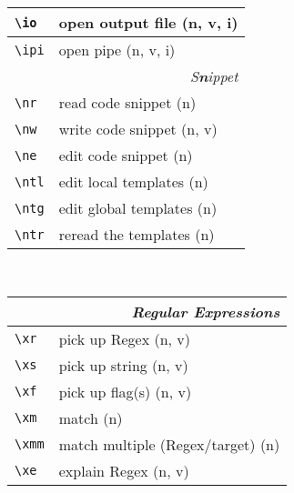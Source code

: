 \documentclass[oneside,10pt,landscape,DIV17]{scrartcl}
\begin{document}
\begin{multicols}{3}
\begin{center}
\begin{tabular}[]{|p{18mm}|p{49mm}|}
\hline \verb'\io'  & open output file          \hfill (n, v, i)\\
\hline \verb'\ipi' & open pipe                 \hfill (n, v, i)\\
\hline
\hline
\multicolumn{2}{|r|}{\textsl{S\textbf{n}ippet}}             \\[1.0ex]
\hline \verb'\nr'  & read code snippet         \hfill (n)   \\
\hline \verb'\nw'  & write code snippet        \hfill (n, v)\\
\hline \verb'\ne'  & edit code snippet         \hfill (n)   \\
%
\hline \verb'\ntl' & edit local templates      \hfill (n)   \\
\hline \verb'\ntg' & edit global templates     \hfill (n)   \\
\hline \verb'\ntr' & reread the templates      \hfill (n)   \\
\hline
\end{tabular}\\
%
%
\begin{tabular}[]{|p{11mm}|p{58mm}|}
\hline
\multicolumn{2}{|r|}{\textsl{Regular E\textbf{x}pressions}}     \\[1.0ex]
\hline \verb'\xr' &  pick up Regex                 \hfill (n, v)\\
\hline \verb'\xs' &  pick up string                \hfill (n, v)\\
\hline \verb'\xf' &  pick up flag(s)               \hfill (n, v)\\
\hline \verb'\xm' &  match                         \hfill (n)   \\
\hline \verb'\xmm'&  match multiple (Regex/target) \hfill (n)   \\
\hline \verb'\xe' &  explain Regex                 \hfill (n, v)\\
\hline

\end{tabular}
\end{center}
\end{multicols}
\end{document}
